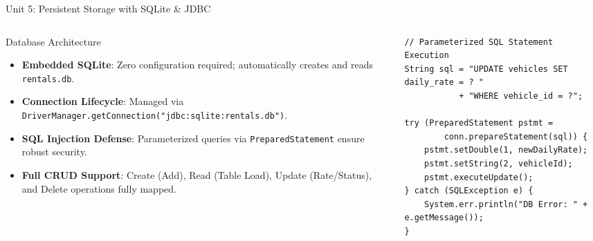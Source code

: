 \documentclass[aspectratio=169,10pt]{beamer}
\begin{document}
\begin{frame}[fragile]{Unit 5: Persistent Storage with SQLite \& JDBC}
    \begin{columns}[T]
        \begin{column}{0.48\textwidth}
            \begin{block}{Database Architecture}
                \small
                \begin{itemize}
                    \item \textbf{Embedded SQLite}: Zero configuration required; automatically creates and reads \texttt{rentals.db}.
                    \item \textbf{Connection Lifecycle}: Managed via \texttt{DriverManager.getConnection("jdbc:sqlite:rentals.db")}.
                    \item \textbf{SQL Injection Defense}: Parameterized queries via \texttt{PreparedStatement} ensure robust security.
                    \item \textbf{Full CRUD Support}: Create (Add), Read (Table Load), Update (Rate/Status), and Delete operations fully mapped.
                \end{itemize}
            \end{block}
        \end{column}
        
        \begin{column}{0.48\textwidth}
\begin{lstlisting}
// Parameterized SQL Statement Execution
String sql = "UPDATE vehicles SET daily_rate = ? " 
           + "WHERE vehicle_id = ?";

try (PreparedStatement pstmt = 
        conn.prepareStatement(sql)) {
    pstmt.setDouble(1, newDailyRate);
    pstmt.setString(2, vehicleId);
    pstmt.executeUpdate();
} catch (SQLException e) {
    System.err.println("DB Error: " + e.getMessage());
}
\end{lstlisting}
        \end{column}
    \end{columns}
\end{frame}
\end{document}
